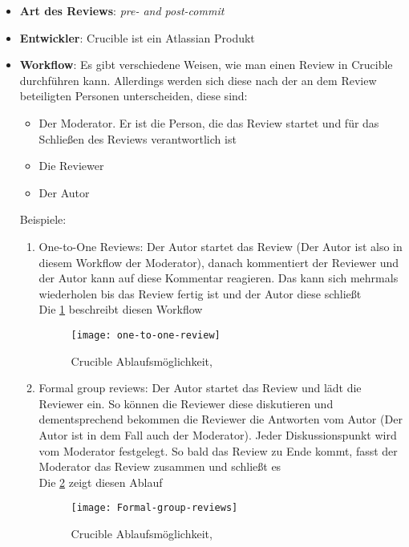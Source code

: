 \begin{itemize}
	\item \textbf{Art des Reviews}: \textit{pre- and post-commit}
	\item \textbf{Entwickler}: Crucible ist ein Atlassian Produkt
	\item \textbf{Workflow}: Es gibt verschiedene Weisen, wie man einen Review in Crucible durchführen kann. Allerdings werden sich diese nach der an dem Review beteiligten Personen
		 unterscheiden, diese sind:
		\begin{itemize}
			\item Der Moderator. Er ist die Person, die das Review startet und für das Schließen des Reviews verantwortlich ist
			\item Die Reviewer
			\item Der Autor
		\end{itemize}
		Beispiele:
		
		\begin{enumerate}
			\item One-to-One Reviews: Der Autor startet das Review (Der Autor ist also in diesem Workflow der Moderator), danach kommentiert der Reviewer und der Autor kann auf diese
				Kommentar reagieren. Das kann sich mehrmals wiederholen bis das Review fertig ist und der Autor diese schließt\\
				Die \cref{fig:one-to-one-workflow} beschreibt diesen Workflow
				\begin{figure}[H]
					\centering
					\texttt{[image: one-to-one-review]}
					\caption[Crucible: one-to-one-review]{Crucible Ablaufsmöglichkeit,\\ \cite{Crucible}}
					\label{fig:one-to-one-workflow}
				\end{figure}
				
			\item Formal group reviews: Der Autor startet das Review und lädt die Reviewer ein. So können die Reviewer diese diskutieren und dementsprechend bekommen die Reviewer 
				die Antworten vom Autor (Der Autor ist in dem Fall auch der Moderator). Jeder Diskussionspunkt wird vom Moderator festgelegt. So bald das Review zu Ende kommt,
				fasst der Moderator das Review zusammen und schließt es\\
				Die \cref{fig:Formal-group-review} zeigt diesen Ablauf
				\begin{figure}[H]
					\centering
					\texttt{[image: Formal-group-reviews]}
					\caption[Crucible: Formal group review]{Crucible Ablaufsmöglichkeit,\\ \cite{Crucible}}
					\label{fig:Formal-group-review}
				\end{figure}
		\end{enumerate}
		
\end{itemize}

